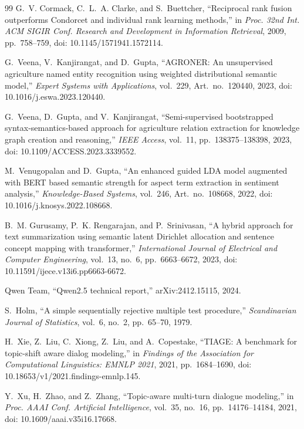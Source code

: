 \documentclass[conference]{IEEEtran}
\begin{document}
\begin{thebibliography}{99}
G.~V. Cormack, C.~L.~A. Clarke, and S.~Buettcher, ``Reciprocal rank fusion outperforms Condorcet and individual rank learning methods,'' in \emph{Proc. 32nd Int. ACM SIGIR Conf. Research and Development in Information Retrieval}, 2009, pp.~758--759, doi: 10.1145/1571941.1572114.

G.~Veena, V.~Kanjirangat, and D.~Gupta, ``AGRONER: An unsupervised agriculture named entity recognition using weighted distributional semantic model,'' \emph{Expert Systems with Applications}, vol.~229, Art.~no.~120440, 2023, doi: 10.1016/j.eswa.2023.120440.

G.~Veena, D.~Gupta, and V.~Kanjirangat, ``Semi-supervised bootstrapped syntax-semantics-based approach for agriculture relation extraction for knowledge graph creation and reasoning,'' \emph{IEEE Access}, vol.~11, pp.~138375--138398, 2023, doi: 10.1109/ACCESS.2023.3339552.

M.~Venugopalan and D.~Gupta, ``An enhanced guided LDA model augmented with BERT based semantic strength for aspect term extraction in sentiment analysis,'' \emph{Knowledge-Based Systems}, vol.~246, Art.~no.~108668, 2022, doi: 10.1016/j.knosys.2022.108668.

B.~M. Gurusamy, P.~K. Rengarajan, and P.~Srinivasan, ``A hybrid approach for text summarization using semantic latent Dirichlet allocation and sentence concept mapping with transformer,'' \emph{International Journal of Electrical and Computer Engineering}, vol.~13, no.~6, pp.~6663--6672, 2023, doi: 10.11591/ijece.v13i6.pp6663-6672.

Qwen Team, ``Qwen2.5 technical report,'' arXiv:2412.15115, 2024.

S.~Holm, ``A simple sequentially rejective multiple test procedure,'' \emph{Scandinavian Journal of Statistics}, vol.~6, no.~2, pp.~65--70, 1979.

H.~Xie, Z.~Liu, C.~Xiong, Z.~Liu, and A.~Copestake, ``TIAGE: A benchmark for topic-shift aware dialog modeling,'' in \emph{Findings of the Association for Computational Linguistics: EMNLP 2021}, 2021, pp.~1684--1690, doi: 10.18653/v1/2021.findings-emnlp.145.

Y.~Xu, H.~Zhao, and Z.~Zhang, ``Topic-aware multi-turn dialogue modeling,'' in \emph{Proc. AAAI Conf. Artificial Intelligence}, vol.~35, no.~16, pp.~14176--14184, 2021, doi: 10.1609/aaai.v35i16.17668.

\end{thebibliography}
\end{document}
